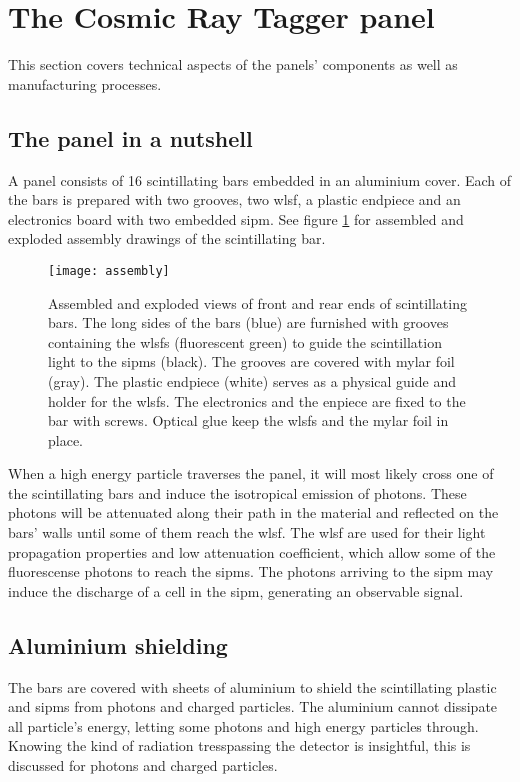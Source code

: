 \section{The Cosmic Ray Tagger panel}

This section covers technical aspects of the panels' components as well as manufacturing processes.

\subsection{The panel in a nutshell}
A panel consists of 16 scintillating bars embedded in an aluminium cover.
Each of the bars is prepared with two grooves, two \gls{wlsf}, a plastic endpiece and an electronics board with two embedded \gls{sipm}.
See figure \ref{fig:exploded_bar} for assembled and exploded assembly drawings of the scintillating bar.

\begin{figure}
  \texttt{[image: assembly]}
  \caption{%
    Assembled and exploded views of front and rear ends of scintillating bars.
    The long sides of the bars (blue) are furnished with grooves containing the \glspl{wlsf} (fluorescent green) to guide the scintillation light to the \glspl{sipm} (black).
    The grooves are covered with mylar foil (gray).
    The plastic endpiece (white) serves as a physical guide and holder for the \glspl{wlsf}.
    The electronics and the enpiece are fixed to the bar with screws.
    Optical glue keep the \glspl{wlsf} and the mylar foil in place.
  }
  \label{fig:exploded_bar}
\end{figure}

When a high energy particle traverses the panel, it will most likely cross one of the scintillating bars and induce the isotropical emission of photons.
These photons will be attenuated along their path in the material and reflected on the bars' walls until some of them reach the \gls{wlsf}.
The \gls{wlsf} are used for their light propagation properties and low attenuation coefficient, which allow some of the fluorescense photons to reach the \glspl{sipm}.
The photons arriving to the \gls{sipm} may induce the discharge of a cell in the \gls{sipm}, generating an observable signal.

\subsection{Aluminium shielding} The bars are covered with sheets of aluminium to shield the scintillating plastic and \glspl{sipm} from photons and charged particles.
The aluminium cannot dissipate all particle's energy, letting some photons and high energy particles through.
Knowing the kind of radiation tresspassing the detector is insightful, this is discussed for photons and charged particles.


